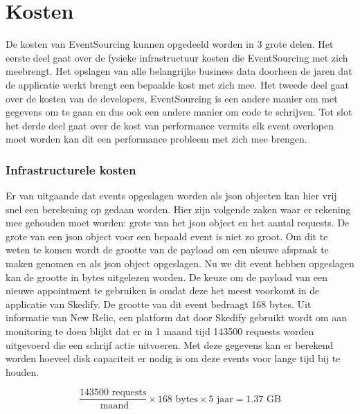 
\chapter{Kosten}
\label{ch:kosten}

De kosten van EventSourcing kunnen opgedeeld worden in 3 grote delen. Het eerste deel gaat over de fysieke infrastructuur kosten die EventSourcing met zich meebrengt. Het opslagen van alle belangrijke business data doorheen de jaren dat de applicatie werkt brengt een bepaalde kost met zich mee. Het tweede deel gaat over de kosten van de developers, EventSourcing is een andere manier om met gegevens om te gaan en dus ook een andere manier om code te schrijven. Tot slot het derde deel gaat over de kost van performance vermits elk event overlopen moet worden kan dit een performance probleem met zich mee brengen.

\subsection{Infrastructurele kosten}
\label{subsec:infrastructurele-kosten}

Er van uitgaande dat events opgeslagen worden als json objecten kan hier vrij snel een berekening op gedaan worden. Hier zijn volgende zaken waar er rekening mee gehouden moet worden: grote van het json object en het aantal requests.
De grote van een json object voor een bepaald event is niet zo groot. Om dit te weten te komen wordt de grootte van de payload om een nieuwe afspraak te maken genomen en als json object opgeslagen. Nu we dit event hebben opgeslagen kan de grootte in bytes uitgelezen worden. De keuze om de payload van een nieuwe appointment te gebruiken is omdat deze het meest voorkomt in de applicatie van Skedify. De grootte van dit event bedraagt 168 bytes.
Uit informatie van New Relic, een platform dat door Skedify gebruikt wordt om aan monitoring te doen blijkt dat er in 1 maand tijd 143500 requests worden uitgevoerd die een schrijf actie uitvoeren.
Met deze gegevens kan er berekend worden hoeveel disk capaciteit er nodig is om deze events voor lange tijd bij te houden.

\begin{equation}
\frac{143 500 \text{ requests}}{\text{ maand}} \times 168 \text{ bytes} \times 5 \text{ jaar} = 1.37 \text{ GB} 
\end{equation}

